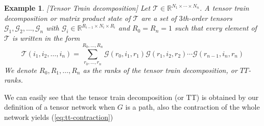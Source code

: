 \documentclass[11pt,a4paper,openright,oneside]{book}
\numberwithin{equation}{section}
\newtheorem{example0}[defn0]{Example}
\newenvironment{example}{ \begin{example0}\rm}{\end{example0}}
\begin{document}
\begin{example}[Tensor Train decomposition]
     Let $\mathcal{T} \in \mathbb{R}^{N_1 \times \cdots \times N_n}$. A tensor
train decomposition or matrix product state of $\mathcal{T}$ are a set of $3$th-order tensors $\mathcal{G}_1,\mathcal{G}_2,\dots,\mathcal{G}_n$ with
    $\mathcal{G}_i \in \mathbb{R}^{R_{i-1} \times N_i \times R_i}$ and $R_0 = R_n = 1$ such that every element of $\mathcal{T}$ is written in the
    form
    \begin{equation} \label{eq:tt-contraction}
    \mathcal{T}(i_1,i_2,\dots,i_n) = \sum_{r_0, \dots, r_n}^{R_0, \dots, R_n} \mathcal{G}(r_0, i_1, r_1) \mathcal{G} (r_1, i_2, r_2) \cdots \mathcal{G}(r_{n-1}, i_n, r_n)
\end{equation}
We denote $R_0, R_1, \dots, R_n$ as the ranks of the tensor train decomposition, or $TT$-ranks.
\end{example}

We can easily see that the tensor train decomposition (or TT) is obtained by our definition of a tensor network when $G$ is a path, also
the contraction of the whole network yields (\ref{eq:tt-contraction})
\end{document}

